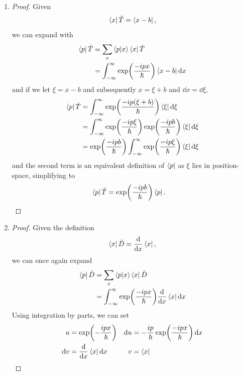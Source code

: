 \begin{enumerate}
\item[3.1] 
  \begin{proof}
    Given
    \begin{equation}
      \bra{x} \hat{T} = \bra{x - b},
    \end{equation}
    we can expand with
    \begin{align*}
      \bra{p} \hat{T} &= \sum_x \braket{p}{x} \bra{x} \hat{T} \\
      &= \int_{-\infty}^{\infty} \exp(\frac{-ipx}{\hbar}) \bra{x - b} \dd{x}
    \end{align*}
    and if we let $\xi = x - b$ and subsequently $x = \xi + b$ and $\dd{x} = \dd{\xi}$,
    \begin{align*}
      \bra{p} \hat{T} &= \int_{-\infty}^{\infty} \exp(\frac{-ip(\xi + b)}{\hbar}) \bra{\xi} \dd{\xi} \\
      &= \int_{-\infty}^{\infty} \exp(\frac{-ip\xi}{\hbar}) \exp(\frac{-ipb}{\hbar}) \bra{\xi} \dd{\xi} \\
      &= \exp(\frac{-ipb}{\hbar}) \int_{-\infty}^{\infty} \exp(\frac{-ip\xi}{\hbar}) \bra{\xi} \dd{\xi}
    \end{align*}
    and the second term is an equivalent definition of $\bra{p}$ as $\xi$ lies in position-space, simplifying to
    \begin{align*}
      \bra{p} \hat{T} &= \exp(\frac{-ipb}{\hbar}) \bra{p}.
    \end{align*}
  \end{proof}
\item[3.2] 
  \begin{proof}
    Given the definition
    \begin{equation}
      \bra{x} \hat{D} = \dv{x} \bra{x},
    \end{equation}
    we can once again expand
    \begin{align*}
      \bra{p} \hat{D} &= \sum_x \braket{p}{x} \bra{x} \hat{D} \\
      &= \int_{-\infty}^{\infty} \exp(\frac{-ipx}{\hbar}) \dv{x} \bra{x} \dd{x}
    \end{align*}
    Using integration by parts, we can set
    \begin{align*}
      u &= \exp(-\frac{ipx}{\hbar}) & \dd{u} &= -\frac{ip}{\hbar} \exp(\frac{-ipx}{\hbar}) \dd{x} \\
      \dd{v} &= \dv{x} \bra{x} \dd{x} & v &= \bra{x}

\end{align*}
\end{proof}
\end{enumerate}
